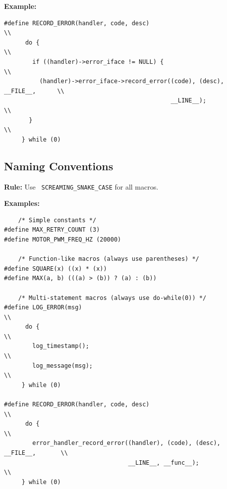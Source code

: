 \textbf{Example:}
\begin{verbatim}
#define RECORD_ERROR(handler, code, desc)                                 \\
      do {                                                                    \\
        if ((handler)->error_iface != NULL) {                                 \\
          (handler)->error_iface->record_error((code), (desc), __FILE__,      \\
                                               __LINE__);                     \\
       }                                                                     \\
     } while (0)
\end{verbatim}

\subsection{Naming Conventions}

\textbf{Rule:} Use \texttt{
      SCREAMING\_SNAKE\_CASE} for all macros.

\textbf{Examples:}
\begin{verbatim}
    /* Simple constants */
#define MAX_RETRY_COUNT (3)
#define MOTOR_PWM_FREQ_HZ (20000)

    /* Function-like macros (always use parentheses) */
#define SQUARE(x) ((x) * (x))
#define MAX(a, b) (((a) > (b)) ? (a) : (b))

    /* Multi-statement macros (always use do-while(0)) */
#define LOG_ERROR(msg)                                                    \\
      do {                                                                    \\
        log_timestamp();                                                      \\
        log_message(msg);                                                     \\
     } while (0)

#define RECORD_ERROR(handler, code, desc)                                 \\
      do {                                                                    \\
        error_handler_record_error((handler), (code), (desc), __FILE__,       \\
                                   __LINE__, __func__);                       \\
     } while (0)
\end{verbatim}

